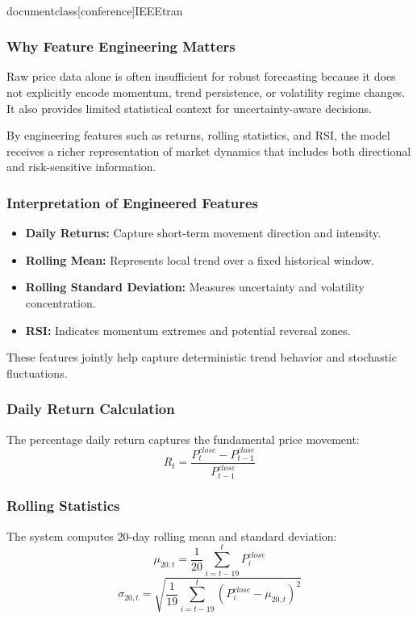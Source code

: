 \\documentclass[conference]{IEEEtran}
\begin{document}
\subsubsection{Why Feature Engineering Matters}
Raw price data alone is often insufficient for robust forecasting because it does not explicitly encode momentum, trend persistence, or volatility regime changes. It also provides limited statistical context for uncertainty-aware decisions.

By engineering features such as returns, rolling statistics, and RSI, the model receives a richer representation of market dynamics that includes both directional and risk-sensitive information.

\subsubsection{Interpretation of Engineered Features}
\begin{itemize}
    \item \textbf{Daily Returns:} Capture short-term movement direction and intensity.
    \item \textbf{Rolling Mean:} Represents local trend over a fixed historical window.
    \item \textbf{Rolling Standard Deviation:} Measures uncertainty and volatility concentration.
    \item \textbf{RSI:} Indicates momentum extremes and potential reversal zones.
\end{itemize}

These features jointly help capture deterministic trend behavior and stochastic fluctuations.

\subsubsection{Daily Return Calculation}
The percentage daily return captures the fundamental price movement:
\begin{equation}
    R_t = \frac{P_t^{close} - P_{t-1}^{close}}{P_{t-1}^{close}}
\end{equation}

\subsubsection{Rolling Statistics}
The system computes 20-day rolling mean and standard deviation:
\begin{equation}
    \mu_{20,t} = \frac{1}{20}\sum_{i=t-19}^{t} P_i^{close}
\end{equation}
\begin{equation}
    \sigma_{20,t} = \sqrt{\frac{1}{19}\sum_{i=t-19}^{t}(P_i^{close} - \mu_{20,t})^2}
\end{equation}
\end{document}

